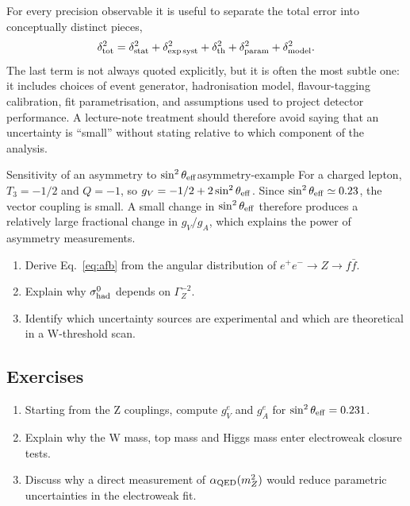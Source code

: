 \documentclass[11pt,a4paper]{article}
\numberwithin{equation}{section}
\begin{document}
For every precision observable it is useful to separate the total error into conceptually distinct pieces,
\begin{equation}
  \delta_{\rm tot}^2 = \delta_{\rm stat}^2 + \delta_{\rm exp\,syst}^2
  + \delta_{\rm th}^2 + \delta_{\rm param}^2 + \delta_{\rm model}^2 .
\end{equation}
The last term is not always quoted explicitly, but it is often the most subtle one: it includes choices of event generator, hadronisation model, flavour-tagging calibration, fit parametrisation, and assumptions used to project detector performance. A lecture-note treatment should therefore avoid saying that an uncertainty is ``small'' without stating relative to which component of the analysis.

\begin{examplebox}{Sensitivity of an asymmetry to \(\sin^2\theta_{\rm eff}\)}{asymmetry-example}
For a charged lepton, \(T_3=-1/2\) and \(Q=-1\), so \(g_V=-1/2+2\sin^2\theta_{\rm eff}\). Since \(\sin^2\theta_{\rm eff}\simeq0.23\), the vector coupling is small. A small change in \(\sin^2\theta_{\rm eff}\) therefore produces a relatively large fractional change in \(g_V/g_A\), which explains the power of asymmetry measurements.
\end{examplebox}

\begin{guidedchecksbox}
\begin{enumerate}[leftmargin=1.6em]
\item Derive Eq.~\eqref{eq:afb} from the angular distribution of \(e^+e^-\to Z\to f\bar f\).
\item Explain why \(\sigma^0_{\rm had}\) depends on \(\Gamma_Z^{-2}\).
\item Identify which uncertainty sources are experimental and which are theoretical in a W-threshold scan.
\end{enumerate}
\end{guidedchecksbox}

\subsection{Exercises}
\begin{enumerate}[leftmargin=1.6em]
\item Starting from the Z couplings, compute \(g_V^e\) and \(g_A^e\) for \(\sin^2\theta_{\rm eff}=0.231\).
\item Explain why the W mass, top mass and Higgs mass enter electroweak closure tests.
\item Discuss why a direct measurement of \(\alpha_{\rm QED}(m_Z^2)\) would reduce parametric uncertainties in the electroweak fit.
\end{enumerate}
\end{document}
